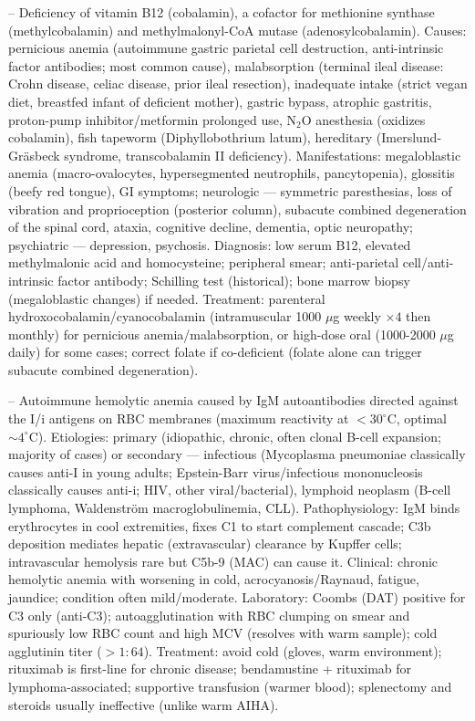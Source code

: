 -- Deficiency of vitamin B12 (cobalamin), a cofactor for methionine synthase (methylcobalamin) and methylmalonyl-CoA mutase (adenosylcobalamin). Causes: pernicious anemia (autoimmune gastric parietal cell destruction, anti-intrinsic factor antibodies; most common cause), malabsorption (terminal ileal disease: Crohn disease, celiac disease, prior ileal resection), inadequate intake (strict vegan diet, breastfed infant of deficient mother), gastric bypass, atrophic gastritis, proton-pump inhibitor/metformin prolonged use, $\mathrm{N_2O}$ anesthesia (oxidizes cobalamin), fish tapeworm (Diphyllobothrium latum), hereditary (Imerslund-Gräsbeck syndrome, transcobalamin II deficiency). Manifestations: megaloblastic anemia (macro-ovalocytes, hypersegmented neutrophils, pancytopenia), glossitis (beefy red tongue), GI symptoms; neurologic — symmetric paresthesias, loss of vibration and proprioception (posterior column), subacute combined degeneration of the spinal cord, ataxia, cognitive decline, dementia, optic neuropathy; psychiatric — depression, psychosis. Diagnosis: low serum B12, elevated methylmalonic acid and homocysteine; peripheral smear; anti-parietal cell/anti-intrinsic factor antibody; Schilling test (historical); bone marrow biopsy (megaloblastic changes) if needed. Treatment: parenteral hydroxocobalamin/cyanocobalamin (intramuscular 1000 $\mu$g weekly $\times 4$ then monthly) for pernicious anemia/malabsorption, or high-dose oral (1000-2000 $\mu$g daily) for some cases; correct folate if co-deficient (folate alone can trigger subacute combined degeneration).

-- Autoimmune hemolytic anemia caused by IgM autoantibodies directed against the I/i antigens on RBC membranes (maximum reactivity at $< 30^\circ$C, optimal $\sim 4^\circ$C). Etiologies: primary (idiopathic, chronic, often clonal B-cell expansion; majority of cases) or secondary — infectious (Mycoplasma pneumoniae classically causes anti-I in young adults; Epstein-Barr virus/infectious mononucleosis classically causes anti-i; HIV, other viral/bacterial), lymphoid neoplasm (B-cell lymphoma, Waldenström macroglobulinemia, CLL). Pathophysiology: IgM binds erythrocytes in cool extremities, fixes C1 to start complement cascade; C3b deposition mediates hepatic (extravascular) clearance by Kupffer cells; intravascular hemolysis rare but C5b-9 (MAC) can cause it. Clinical: chronic hemolytic anemia with worsening in cold, acrocyanosis/Raynaud, fatigue, jaundice; condition often mild/moderate. Laboratory: Coombs (DAT) positive for C3 only (anti-C3); autoagglutination with RBC clumping on smear and spuriously low RBC count and high MCV (resolves with warm sample); cold agglutinin titer ($> 1:64$). Treatment: avoid cold (gloves, warm environment); rituximab is first-line for chronic disease; bendamustine + rituximab for lymphoma-associated; supportive transfusion (warmer blood); splenectomy and steroids usually ineffective (unlike warm AIHA).

